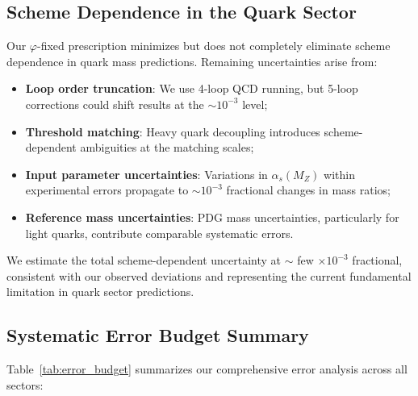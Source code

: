 \documentclass[%
amsmath,amssymb,
aps,
prb,
floatfix,
twocolumn
]{revtex4-2}
\begin{document}
\subsection{Scheme Dependence in the Quark Sector}
\label{subsec:scheme_dependence}

Our $\varphi$-fixed prescription minimizes but does not completely eliminate scheme dependence in quark mass predictions. Remaining uncertainties arise from:

\begin{itemize}
\item \textbf{Loop order truncation}: We use 4-loop QCD running, but 5-loop corrections could shift results at the $\sim 10^{-3}$ level;

\item \textbf{Threshold matching}: Heavy quark decoupling introduces scheme-dependent ambiguities at the matching scales;

\item \textbf{Input parameter uncertainties}: Variations in $\alpha_s(M_Z)$ within experimental errors propagate to $\sim 10^{-3}$ fractional changes in mass ratios;

\item \textbf{Reference mass uncertainties}: PDG mass uncertainties, particularly for light quarks, contribute comparable systematic errors.
\end{itemize}

We estimate the total scheme-dependent uncertainty at $\sim$ few $\times 10^{-3}$ fractional, consistent with our observed deviations and representing the current fundamental limitation in quark sector predictions.

\subsection{Systematic Error Budget Summary}

Table~\ref{tab:error_budget} summarizes our comprehensive error analysis across all sectors:
\end{document}

